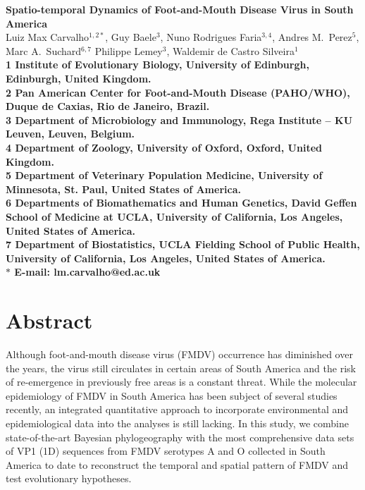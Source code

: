 \documentclass[10pt]{article}
\date{}
\begin{document}
\begin{flushleft}
{\Large
\textbf{Spatio-temporal Dynamics of Foot-and-Mouth Disease Virus in South America}
}
\\
Luiz Max Carvalho$^{1,2\ast}$,
Guy Baele$^{3}$,
Nuno Rodrigues Faria$^{3,4}$,
Andres M.~Perez$^{5}$,
Marc A.~Suchard$^{6,7}$
Philippe Lemey$^{3}$,
Waldemir de Castro Silveira$^{1}$
\\
\bf{1} Institute of Evolutionary Biology, University of Edinburgh, Edinburgh, United Kingdom.
\\
\bf{2} Pan American Center for Foot-and-Mouth Disease (PAHO/WHO), Duque de Caxias, Rio de Janeiro, Brazil.
\\
\bf{3} Department of Microbiology and Immunology, Rega Institute -- KU Leuven, Leuven, Belgium.
\\
\bf{4} Department of Zoology, University of Oxford, Oxford, United Kingdom.
\\
\bf{5} Department of Veterinary Population Medicine, University of Minnesota, St. Paul, United States of America.
\\
\bf{6} Departments of Biomathematics and Human Genetics, David Geffen School of Medicine at UCLA, University of California, Los Angeles,  United States of America.\\
\bf{7} Department of Biostatistics, UCLA Fielding School of Public Health, University of California, Los Angeles,  United States of America.
\\
$\ast$ E-mail: lm.carvalho@ed.ac.uk
\end{flushleft}
\section*{Abstract}

Although foot-and-mouth disease virus (FMDV) occurrence has diminished over the years, the virus still circulates in certain areas of South America and the risk of re-emergence in previously free areas is a constant threat.
While the molecular epidemiology of FMDV in South America has been subject of several studies recently, an integrated quantitative approach to incorporate environmental and epidemiological data into the analyses is still lacking.
In this study, we combine state-of-the-art Bayesian phylogeography with the most comprehensive data sets of VP1 (1D) sequences from FMDV serotypes A and O collected in South America to date  to  reconstruct the temporal and spatial pattern of FMDV and test evolutionary hypotheses.
\end{document}
